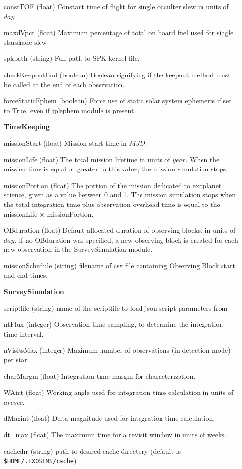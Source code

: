 \documentclass[cleanfoot]{asme2ej}
\begin{document}
\begin{itemize}[leftmargin=1.5in,font={\ttfamily}]
\item[constTOF] (float) Constant time of flight for single occulter slew in units of $ day $
\item[maxdVpct] (float) Maximum percentage of total on board fuel used for single starshade slew
\item[spkpath] (string) Full path to SPK kernel file.
\item[checkKeepoutEnd] (boolean) Boolean signifying if the keepout method must be called at the end of each observation.
\item[forceStaticEphem]  (boolean) Force use of static solar system ephemeris if set to True, even if jplephem module is present.

\item[\textbf{TimeKeeping}]
\item[missionStart] (float) Mission start time in $ MJD $. 
\item[missionLife] (float) The total mission lifetime in units of $ year $.  When the mission time is equal or greater to this value, the mission simulation stops.
\item[missionPortion] (float) The portion of the mission dedicated to exoplanet science, given as a value between 0 and 1. The mission simulation stops when the total integration time plus observation overhead time is equal to the missionLife $\times$ missionPortion.
\item[OBduration] (float) Default allocated duration of observing blocks, in units of $day$. If no OBduration was specified, a new observing block is created for each new observation in the SurveySimulation module.
\item[missionSchedule] (string) filename of csv file containing Observing Block start and end times.

\item[\textbf{SurveySimulation}]
\item[scriptfile] (string) name of the scriptfile to load json script parameters from
\item[ntFlux] (integer) Observation time sampling, to determine the integration time interval.
\item[nVisitsMax] (integer) Maximum number of observations (in detection mode) per star. 
\item[charMargin] (float) Integration time margin for characterization. 
\item[WAint] (float) Working angle used for integration time calculation in units of $arcsec$.
\item[dMagint] (float) Delta magnitude used for integration time calculation.
\item[dt\_max] (float) The maximum time for a revisit window in units of weeks.
\item[cachedir] (string) path to desired cache directory (default is \texttt{\$HOME/.EXOSIMS/cache})


\end{itemize}
\end{document}
